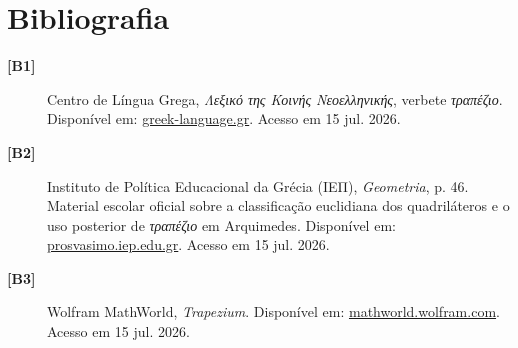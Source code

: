 \documentclass[booklanguage=brazilian]{byrnebook}
\begin{document}
\chapter*{Bibliografia}
\begin{description}
\item[\label{bib:greek-dictionary}\textbf{[B1]}] Centro de Língua Grega, \emph{Λεξικό της Κοινής Νεοελληνικής}, verbete \emph{τραπέζιο}. Disponível em: \href{https://www.greek-language.gr/greekLang/modern_greek/tools/lexica/triantafyllides/search.html?lq=%CF%84%CF%81%CE%B1%CF%80%CE%AD%CE%B6%CE%B9%CE%BF}{greek-language.gr}. Acesso em 15 jul. 2026.
\item[\label{bib:iep}\textbf{[B2]}] Instituto de Política Educacional da Grécia (ΙΕΠ), \emph{Geometria}, p. 46. Material escolar oficial sobre a classificação euclidiana dos quadriláteros e o uso posterior de \emph{τραπέζιο} em Arquimedes. Disponível em: \href{https://prosvasimo.iep.edu.gr/Books/Eidikh-Agwgh-PI/books/a_likeiou/l_a_arial-18b/l_a_geom_arial_18b/l_a-b_geom_bm_%2895-180%29_18b.pdf}{prosvasimo.iep.edu.gr}. Acesso em 15 jul. 2026.
\item[\label{bib:mathworld}\textbf{[B3]}] Wolfram MathWorld, \emph{Trapezium}. Disponível em: \href{https://mathworld.wolfram.com/Trapezium.html}{mathworld.wolfram.com}. Acesso em 15 jul. 2026.
\end{description}

\tableofcontents
\end{document}
